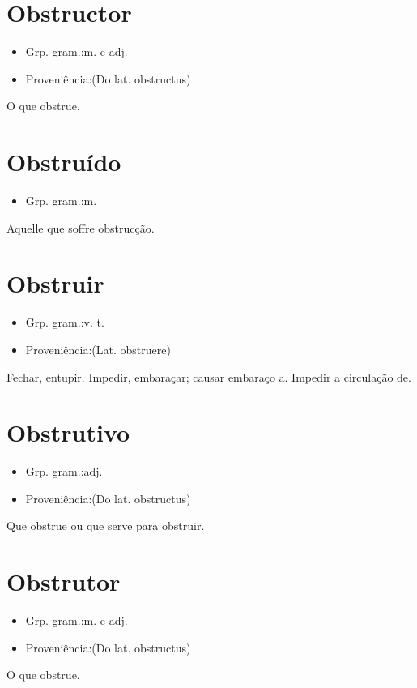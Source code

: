 \section{Obstructor}
\begin{itemize}
\item {Grp. gram.:m.  e  adj.}
\end{itemize}
\begin{itemize}
\item {Proveniência:(Do lat. \textunderscore obstructus\textunderscore )}
\end{itemize}
O que obstrue.
\section{Obstruído}
\begin{itemize}
\item {Grp. gram.:m.}
\end{itemize}
Aquelle que soffre obstrucção.
\section{Obstruir}
\begin{itemize}
\item {Grp. gram.:v. t.}
\end{itemize}
\begin{itemize}
\item {Proveniência:(Lat. \textunderscore obstruere\textunderscore )}
\end{itemize}
Fechar, entupir.
Impedir, embaraçar; causar embaraço a.
Impedir a circulação de.
\section{Obstrutivo}
\begin{itemize}
\item {Grp. gram.:adj.}
\end{itemize}
\begin{itemize}
\item {Proveniência:(Do lat. \textunderscore obstructus\textunderscore )}
\end{itemize}
Que obstrue ou que serve para obstruir.
\section{Obstrutor}
\begin{itemize}
\item {Grp. gram.:m.  e  adj.}
\end{itemize}
\begin{itemize}
\item {Proveniência:(Do lat. \textunderscore obstructus\textunderscore )}
\end{itemize}
O que obstrue.
